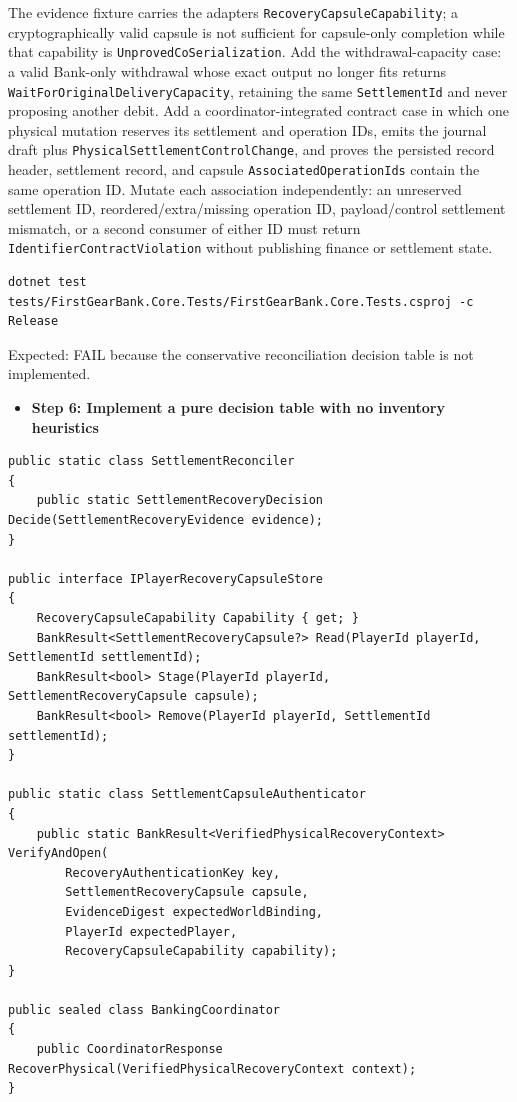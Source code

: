 \documentclass[
  10pt,
  letterpaper,
]{article}
\newcommand{\passthrough}[1]{#1}
\providecommand{\tightlist}{%
  \setlength{\itemsep}{0pt}\setlength{\parskip}{0pt}}
\begin{document}
The evidence fixture carries the adapter\textquotesingle s
\texttt{RecoveryCapsuleCapability}; a cryptographically valid capsule is
not sufficient for capsule-only completion while that capability is
\passthrough{\lstinline!UnprovedCoSerialization!}. Add the
withdrawal-capacity case: a valid Bank-only withdrawal whose exact
output no longer fits returns \texttt{WaitForOriginalDeliveryCapacity},
retaining the same \passthrough{\lstinline!SettlementId!} and never
proposing another debit. Add a coordinator-integrated contract case in
which one physical mutation reserves its settlement and operation IDs,
emits the journal draft plus \texttt{PhysicalSettlementControlChange},
and proves the persisted record header, settlement record, and capsule
\passthrough{\lstinline!AssociatedOperationIds!} contain the same
operation ID. Mutate each association independently: an unreserved
settlement ID, reordered/\allowbreak{}extra/\allowbreak{}missing
operation ID, payload/control settlement mismatch, or a second consumer
of either ID must return \texttt{IdentifierContractViolation} without
publishing finance or settlement state.

\begin{lstlisting}
dotnet test tests/FirstGearBank.Core.Tests/FirstGearBank.Core.Tests.csproj -c Release
\end{lstlisting}

Expected: FAIL because the conservative reconciliation decision table is
not implemented.

\begin{itemize}
\tightlist
\item[$\square$]
  \textbf{Step 6: Implement a pure decision table with no inventory
  heuristics}
\end{itemize}

\begin{lstlisting}
public static class SettlementReconciler
{
    public static SettlementRecoveryDecision Decide(SettlementRecoveryEvidence evidence);
}

public interface IPlayerRecoveryCapsuleStore
{
    RecoveryCapsuleCapability Capability { get; }
    BankResult<SettlementRecoveryCapsule?> Read(PlayerId playerId, SettlementId settlementId);
    BankResult<bool> Stage(PlayerId playerId, SettlementRecoveryCapsule capsule);
    BankResult<bool> Remove(PlayerId playerId, SettlementId settlementId);
}

public static class SettlementCapsuleAuthenticator
{
    public static BankResult<VerifiedPhysicalRecoveryContext> VerifyAndOpen(
        RecoveryAuthenticationKey key,
        SettlementRecoveryCapsule capsule,
        EvidenceDigest expectedWorldBinding,
        PlayerId expectedPlayer,
        RecoveryCapsuleCapability capability);
}

public sealed class BankingCoordinator
{
    public CoordinatorResponse RecoverPhysical(VerifiedPhysicalRecoveryContext context);
}
\end{lstlisting}
\end{document}
